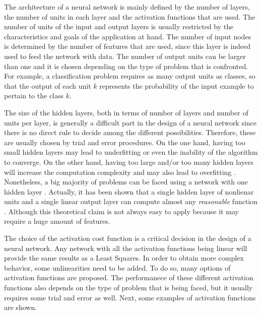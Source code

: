 \documentclass[a4paper, report, oneside, UKenglish]{memoir}
\begin{document}
The architecture of a neural network is mainly defined by the number of layers, the number of units in each layer and the activation functions that are used. The number of units of the input and output layers is usually restricted by the characteristics and goals of the application at hand. The number of input nodes is determined by the number of features that are used, since this layer is indeed used to feed the network with data. The number of output units can be larger than one and it is chosen depending on the type of problem that is confronted. For example, a classification problem requires as many output units as classes, so that the output of each unit $k$ represents the probability of the input example to pertain to the class $k$. 

The size of the hidden layers, both in terms of number of layers and number of units per layer, is generally a difficult part in the design of a neural network since there is no direct rule to decide among the different possibilities. Therefore, these are usually chosen by trial and error procedures. On the one hand, having too small hidden layers may lead to underfitting or even the inability of the algorithm to converge. On the other hand, having too large and/or too many hidden layers will increase the computation complexity and may also lead to overfitting \cite{aggarwal_neural_2018}. Nonetheless, a big majority of problems can be faced using a network with one hidden layer \cite{aggarwal_neural_2018}. Actually, it has been shown that a single hidden layer of nonlienar units and a single linear output layer can compute almost any \textit{reasonable} function \cite{hornik_multilayer_1989}. Although this theoretical claim is not always easy to apply because it may require a huge amount of features.

The choice of the activation cost function is a critical decision in the design of a neural network. Any network with all the activation functions being linear will provide the same results as a Least Squares. In order to obtain more complex behavior, some unlinearities need to be added. To do so, many options of activation functions are proposed. The performanece of these different activation functions also depends on the type of problem that is being faced, but it usually requires some trial and error as well. Next, some examples of activation functions are shown.
\end{document}
